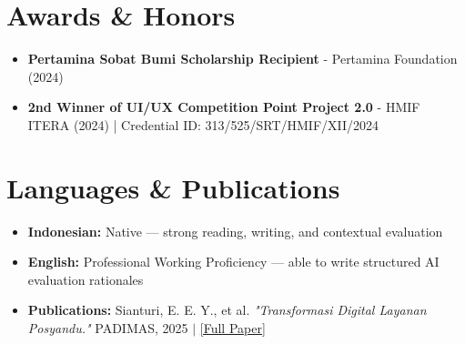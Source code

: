 \section*{Awards \& Honors}
\begin{itemize}
  \item \textbf{Pertamina Sobat Bumi Scholarship Recipient} - Pertamina Foundation (2024)
  \item \textbf{2nd Winner of UI/UX Competition Point Project 2.0} - HMIF ITERA (2024) | Credential ID: 313/525/SRT/HMIF/XII/2024
\end{itemize}

\section*{Languages \& Publications}
\begin{itemize}
  \item \textbf{Indonesian:} Native — strong reading, writing, and contextual evaluation
  \item \textbf{English:} Professional Working Proficiency — able to write structured AI evaluation rationales
  \item \textbf{Publications:} Sianturi, E. E. Y., et al. \textit{"Transformasi Digital Layanan Posyandu."} PADIMAS, 2025 $|$ \href{https://jurnal.mdp.ac.id/index.php/padimas/article/view/12206}{\footnotesize [Full Paper]}
\end{itemize}
